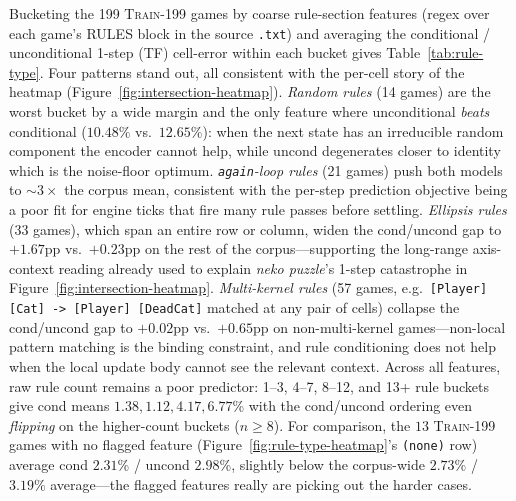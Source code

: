 Bucketing the 199 \textsc{Train-199} games by coarse rule-section
features (regex over each game's RULES block in the source
\texttt{.txt}) and averaging the conditional / unconditional 1-step
(TF) cell-error within each bucket gives Table~\ref{tab:rule-type}.
Four patterns stand out, all consistent with the per-cell story of
the heatmap (Figure~\ref{fig:intersection-heatmap}). \emph{Random
rules} (14 games) are the worst bucket by a wide margin and the only
feature where unconditional \emph{beats} conditional ($10.48\%$ vs.\
$12.65\%$): when the next state has an irreducible random component
the encoder cannot help, while uncond degenerates closer to identity
which is the noise-floor optimum. \emph{\texttt{again}-loop rules}
(21 games) push both models to ${\sim}3\times$ the corpus mean,
consistent with the per-step prediction objective being a poor fit
for engine ticks that fire many rule passes before settling.
\emph{Ellipsis rules} (33 games), which span an entire row or column,
widen the cond/uncond gap to $+1.67$pp vs.\ $+0.23$pp on the rest of
the corpus---supporting the long-range axis-context reading already
used to explain \textit{neko puzzle}'s 1-step catastrophe in
Figure~\ref{fig:intersection-heatmap}. \emph{Multi-kernel rules} (57
games, e.g.\ \texttt{[Player] [Cat] -> [Player] [DeadCat]} matched
at any pair of cells) collapse the cond/uncond gap to $+0.02$pp vs.\
$+0.65$pp on non-multi-kernel games---non-local pattern matching is
the binding constraint, and rule conditioning does not help when the
local update body cannot see the relevant context. Across all
features, raw rule count remains a poor predictor: 1--3, 4--7, 8--12,
and 13+ rule buckets give cond means $1.38, 1.12, 4.17, 6.77$\% with
the cond/uncond ordering even \emph{flipping} on the higher-count
buckets ($n{\geq}8$). For comparison, the $13$ \textsc{Train-199}
games with no flagged feature
(Figure~\ref{fig:rule-type-heatmap}'s \texttt{(none)} row) average
cond $2.31\%$ / uncond $2.98\%$, slightly below the corpus-wide
$2.73\%$ / $3.19\%$ average---the flagged features really are
picking out the harder cases.

\begin{table}[t]
  \centering
  \caption{\textbf{Per-rule-type 1-step (TF) cell-error on
    \textsc{Train-199} (in-distribution).} Each row reports the mean
    across the $n$ \textsc{Train-199} games matching the feature flag
    (or its negation). $\Delta$ is uncond--cond.}
  \label{tab:rule-type}
  \small
  
\end{table}

